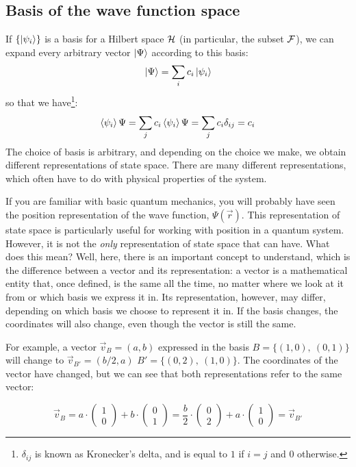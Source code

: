 \subsection{Basis of the wave function space}

If $\{\ket{\psi_i}\}$ is a basis for a Hilbert space $\mathcal{H}$ (in particular, the subset $\mathcal{F}$), we can expand every arbitrary vector $\ket{\Psi}$ according to this basis:
\begin{equation}
    \ket{\Psi} = \sum_i c_i \ket{\psi_i}
\end{equation}
so that we have\footnote{$\delta_{ij}$ is known as Kronecker's delta, and is equal to $1$ if $i=j$ and $0$ otherwise.}:
\begin{equation}
    \braket{\psi_i}{\Psi} = \sum_j c_i \braket{\psi_i}{\Psi} = \sum_j c_i\delta_{ij} = c_i
\end{equation}
The choice of basis is arbitrary, and depending on the choice we make, we obtain different representations of state space. There are many different representations, which often have to do with physical properties of the system. 

If you are familiar with basic quantum mechanics, you will probably have seen the position representation of the wave function, $\Psi\left(\vec{r}\right)$. This representation of state space is particularly useful for working with position in a quantum system. However, it is not the \textit{only} representation of state space that can have. What does this mean? Well, here, there is an important concept to understand, which is the difference between a vector and its representation: a vector is a mathematical entity that, once defined, is the same all the time, no matter where we look at it from or which basis we express it in. Its representation, however, may differ, depending on which basis we choose to represent it in. If the basis changes, the coordinates will also change, even though the vector is still the same.

For example, a vector $\vec{v}_B = (a, b)$ expressed in the basis $B=\{(1, 0),\ (0, 1)\}$ will change to $\vec{v}_{B'} = (b/2, a)$ $B'=\{(0, 2),\ (1, 0)\}$. The coordinates of the vector have changed, but we can see that both representations refer to the same vector:

\begin{equation}
    \vec{v}_B = a\cdot \begin{pmatrix}
        1 \\ 0
    \end{pmatrix} + b \cdot \begin{pmatrix}
        0 \\ 1
    \end{pmatrix} = 
    \frac{b}{2}\cdot \begin{pmatrix}
        0 \\ 2
    \end{pmatrix} + a \cdot \begin{pmatrix}
        1 \\ 0
    \end{pmatrix} = \vec{v}_{B'}
\end{equation}

